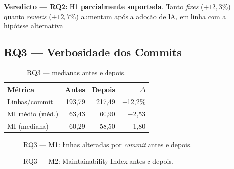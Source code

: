 \documentclass[12pt,a4paper,twocolumn]{article}
\begin{document}
\textbf{Veredicto — RQ2:} H1 \textbf{parcialmente suportada}. Tanto
\textit{fixes} ($+12{,}3\%$) quanto \textit{reverts} ($+12{,}7\%$) aumentam
após a adoção de IA, em linha com a hipótese alternativa.

\subsection{RQ3 — Verbosidade dos Commits}

\begin{table}[t]
\centering\caption{RQ3 — medianas antes e depois.}\label{tab:rq3}
\small\setlength{\tabcolsep}{4pt}
\begin{tabular}{lrrr}
\toprule
\textbf{Métrica} & \textbf{Antes} & \textbf{Depois} & \textbf{$\Delta$} \\
\midrule
Linhas/commit    & 193,79 & 217,49 & \textcolor{agreen}{$+$12,2\%} \\
MI médio (méd.) & 63,43  & 60,90  & \textcolor{ared}{$-$2,53} \\
MI (mediana)    & 60,29  & 58,50  & \textcolor{ared}{$-$1,80} \\
\bottomrule
\end{tabular}
\end{table}

\begin{figure}[t]
\centering
{}
\caption{RQ3 — M1: linhas alteradas por \textit{commit} antes e depois.}
\label{fig:rq3m1}
\end{figure}

\begin{figure}[t]
\centering
{}
\caption{RQ3 — M2: Maintainability Index antes e depois.}
\label{fig:rq3m2}
\end{figure}
\end{document}
